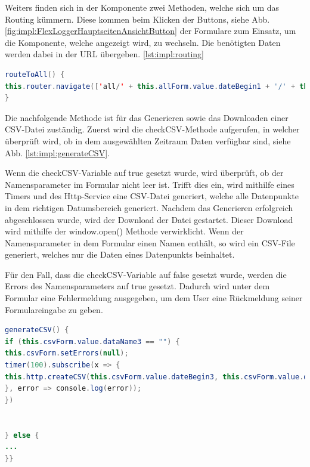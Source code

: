 Weiters finden sich in der Komponente zwei Methoden, welche sich um das Routing kümmern. Diese kommen beim Klicken der Buttons, siehe Abb. \ref{fig:impl:FlexLoggerHauptseitenAnsichtButton} der Formulare zum Einsatz, um die Komponente, welche angezeigt wird, zu wechseln. Die benötigten Daten werden dabei in der URL übergeben. \ref{lst:impl:routing}



\begin{lstlisting}[language=java,caption=Routing zu anderer Komponente,label=lst:impl:routing]
routeToAll() {
this.router.navigate(['all/' + this.allForm.value.dateBegin1 + '/' + this.allForm.value.timeBegin1 + '/' + this.allForm.value.dateEnd1 + '/' + this.allForm.value.timeEnd1], {relativeTo: this.route});
}
\end{lstlisting}




Die nachfolgende Methode ist für das Generieren sowie das Downloaden einer CSV-Datei zuständig. Zuerst wird die checkCSV-Methode aufgerufen, in welcher überprüft wird, ob in dem ausgewählten Zeitraum Daten verfügbar sind, siehe Abb. \ref{lst:impl:generateCSV}.


Wenn die checkCSV-Variable auf true gesetzt wurde, wird überprüft, ob der Namensparameter im Formular nicht leer ist. Trifft dies ein, wird mithilfe eines Timers und des Http-Service eine CSV-Datei generiert, welche alle Datenpunkte in dem richtigen Datumsbereich generiert. Nachdem das Generieren erfolgreich abgeschlossen wurde, wird der Download der Datei gestartet. Dieser Download wird mithilfe der window.open() Methode verwirklicht. Wenn der Namensparameter in dem Formular einen Namen enthält, so wird ein CSV-File generiert, welches nur die Daten eines Datenpunkts beinhaltet.


Für den Fall, dass die checkCSV-Variable auf false gesetzt wurde, werden die Errors des Namensparameters auf true gesetzt. Dadurch wird unter dem Formular eine Fehlermeldung ausgegeben, um dem User eine Rückmeldung seiner Formulareingabe zu geben.

\newpage

\begin{lstlisting}[language=java,caption=CSV-File generieren,label=lst:impl:generateCSV]
generateCSV() {
if (this.csvForm.value.dataName3 == "") {
this.csvForm.setErrors(null);
timer(100).subscribe(x => {
this.http.createCSV(this.csvForm.value.dateBegin3, this.csvForm.value.dateEnd3, this.csvForm.value.timeBegin3, this.csvForm.value.timeEnd3, "C:/angular1/monitor.csv").subscribe(value => { window.open("http://localhost:8081/logEntry/download/");
}, error => console.log(error));
})


} else {
...
}}
\end{lstlisting}



